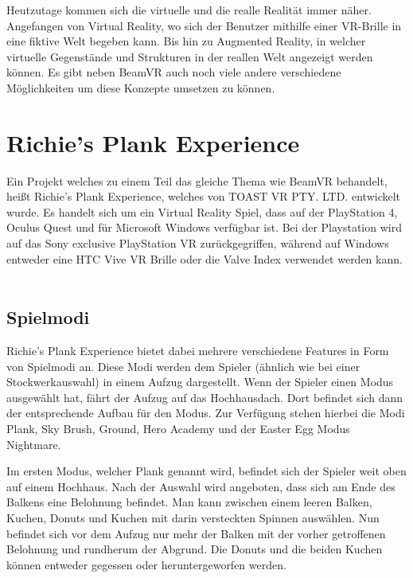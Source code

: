 %

Heutzutage kommen sich die virtuelle und die realle Realität immer näher.
Angefangen von Virtual Reality, wo sich der Benutzer mithilfe einer VR-Brille in eine fiktive Welt begeben kann.
Bis hin zu Augmented Reality, in welcher virtuelle Gegenstände und Strukturen in der reallen Welt angezeigt werden können.
Es gibt neben BeamVR auch noch viele andere verschiedene M\"oglichkeiten um diese Konzepte umsetzen zu können.



\section{Richie's Plank Experience}
\label{sec:richiesplankexperience}
Ein Projekt welches zu einem Teil das gleiche Thema wie BeamVR behandelt, heißt Richie's Plank Experience, welches von TOAST VR PTY. LTD. entwickelt wurde.
Es handelt sich um ein Virtual Reality Spiel, dass auf der PlayStation 4, Oculus Quest und f\"ur Microsoft Windows verf\"ugbar ist.
Bei der Playstation wird auf das Sony exclusive PlayStation VR zur\"uckgegriffen, während auf Windows entweder eine HTC Vive VR Brille oder die Valve Index verwendet werden kann.
~\cite{ToastGames_2021}

\subsection{Spielmodi}
\label{sec:richiesplankexperience_modes}
Richie's Plank Experience bietet dabei mehrere verschiedene Features in Form von Spielmodi an.
Diese Modi werden dem Spieler (\"ahnlich wie bei einer Stockwerkauswahl) in einem Aufzug dargestellt.
Wenn der Spieler einen Modus ausgewählt hat, fährt der Aufzug auf das Hochhausdach.
Dort befindet sich dann der entsprechende Aufbau für den Modus.
Zur Verfügung stehen hierbei die Modi Plank, Sky Brush, Ground, Hero Academy und der Easter Egg Modus Nightmare.
~\cite{ToastGames_2021_Steam}

Im ersten Modus, welcher Plank genannt wird, befindet sich der Spieler weit oben auf einem Hochhaus.
Nach der Auswahl wird angeboten, dass sich am Ende des Balkens eine Belohnung befindet.
Man kann zwischen einem leeren Balken, Kuchen, Donuts und Kuchen mit darin versteckten Spinnen auswählen.
Nun befindet sich vor dem Aufzug nur mehr der Balken mit der vorher getroffenen Belohnung und rundherum der Abgrund.
Die Donuts und die beiden Kuchen können entweder gegessen oder heruntergeworfen werden.
~\cite{ToastGames_2021_Steam}

